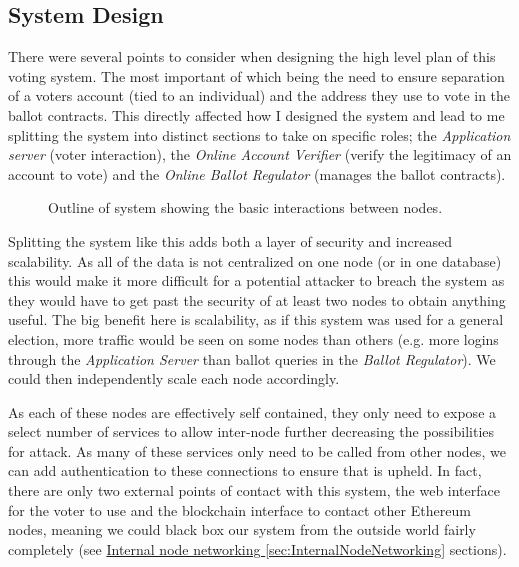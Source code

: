 \documentclass{article}
\begin{document}
\clearpage
\subsection{System Design}
\label{sec:SystemDesign}
There were several points to consider when designing the high level plan of this voting system. The most important of which being the need to ensure separation of a voters account (tied to an individual) and the address they use to vote in the ballot contracts. This directly affected how I designed the system and lead to me splitting the system into distinct sections to take on specific roles; the \textit{Application server} (voter interaction), the \textit{Online Account Verifier} (verify the legitimacy of an account to vote) and the \textit{Online Ballot Regulator} (manages the ballot contracts).

\begin{figure}[h]
	\noindent
	\caption{Outline of system showing the basic interactions between nodes.}
\end{figure}

Splitting the system like this adds both a layer of security and increased scalability. As all of the data is not centralized on one node (or in one database) this would make it more difficult for a potential attacker to breach the system as they would have to get past the security of at least two nodes to obtain anything useful. The big benefit here is scalability, as if this system was used for a general election, more traffic would be seen on some nodes than others (e.g. more logins through the \textit{Application Server} than ballot queries in the \textit{Ballot Regulator}). We could then independently scale each node accordingly.

As each of these nodes are effectively self contained, they only need to expose a select number of services to allow inter-node further decreasing the possibilities for attack. As many of these services only need to be called from other nodes, we can add authentication to these connections to ensure that is upheld. In fact, there are only two external points of contact with this system, the web interface for the voter to use and the blockchain interface to contact other Ethereum nodes, meaning we could black box our system from the outside world fairly completely (see \hyperref[sec:InternalNodeNetworking]{Internal node networking \ref*{sec:InternalNodeNetworking}} sections).
\end{document}
